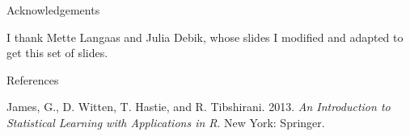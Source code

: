 \documentclass[10pt,ignorenonframetext,]{beamer}
\begin{document}
\begin{frame}{Acknowledgements}

I thank Mette Langaas and Julia Debik, whose slides I modified and
adapted to get this set of slides.

\end{frame}

\begin{frame}{References}

\hypertarget{refs}{}
\hypertarget{ref-james.etal}{}
James, G., D. Witten, T. Hastie, and R. Tibshirani. 2013. \emph{An
Introduction to Statistical Learning with Applications in R}. New York:
Springer.

\end{frame}
\end{document}
